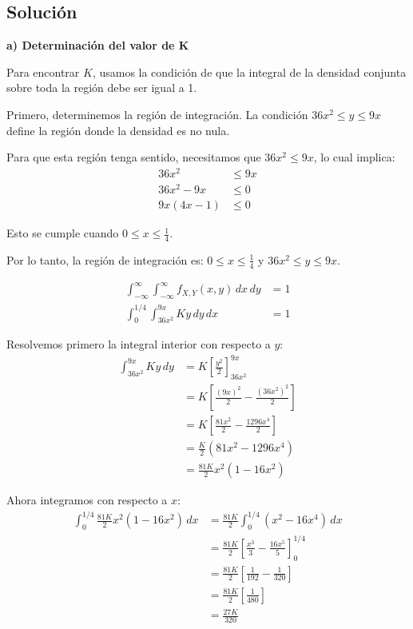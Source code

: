 \documentclass[11pt,a4paper]{article}
\begin{document}
\subsection{Solución}

\textbf{a) Determinación del valor de K}

Para encontrar $K$, usamos la condición de que la integral de la densidad conjunta sobre toda la región debe ser igual a 1.

Primero, determinemos la región de integración. La condición $36x^2 \leq y \leq 9x$ define la región donde la densidad es no nula.

Para que esta región tenga sentido, necesitamos que $36x^2 \leq 9x$, lo cual implica:
\begin{align*}
36x^2 &\leq 9x \\
36x^2 - 9x &\leq 0 \\
9x(4x - 1) &\leq 0
\end{align*}

Esto se cumple cuando $0 \leq x \leq \frac{1}{4}$.

Por lo tanto, la región de integración es: $0 \leq x \leq \frac{1}{4}$ y $36x^2 \leq y \leq 9x$.

\begin{align*}
\int_{-\infty}^{\infty} \int_{-\infty}^{\infty} f_{X,Y}(x,y) \, dx \, dy &= 1 \\
\int_{0}^{1/4} \int_{36x^2}^{9x} Ky \, dy \, dx &= 1
\end{align*}

Resolvemos primero la integral interior con respecto a $y$:
\begin{align*}
\int_{36x^2}^{9x} Ky \, dy &= K \left[ \frac{y^2}{2} \right]_{36x^2}^{9x} \\
&= K \left[ \frac{(9x)^2}{2} - \frac{(36x^2)^2}{2} \right] \\
&= K \left[ \frac{81x^2}{2} - \frac{1296x^4}{2} \right] \\
&= \frac{K}{2} (81x^2 - 1296x^4) \\
&= \frac{81K}{2} x^2 (1 - 16x^2)
\end{align*}

Ahora integramos con respecto a $x$:
\begin{align*}
\int_{0}^{1/4} \frac{81K}{2} x^2 (1 - 16x^2) \, dx &= \frac{81K}{2} \int_{0}^{1/4} (x^2 - 16x^4) \, dx \\
&= \frac{81K}{2} \left[ \frac{x^3}{3} - \frac{16x^5}{5} \right]_{0}^{1/4} \\
&= \frac{81K}{2} \left[ \frac{1}{192} - \frac{1}{320} \right] \\
&= \frac{81K}{2} \left[ \frac{1}{480} \right] \\
&= \frac{27K}{320}
\end{align*}
\end{document}
